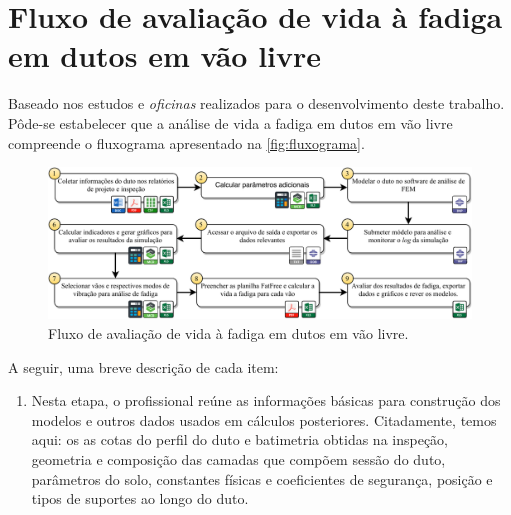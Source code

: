 \section{Fluxo de avaliação de vida à fadiga em dutos em vão livre}\label{chap:workflow}


Baseado nos estudos e \textit{oficinas} realizados para o desenvolvimento deste trabalho. Pôde-se estabelecer que a análise de vida a fadiga em dutos em vão livre compreende o fluxograma apresentado na \autoref{fig:fluxograma}.

\begin{figure}[!ht]
    \centering
    \caption{Fluxo de avaliação de vida à fadiga em dutos em vão livre.}\label{fig:fluxograma}
    \includegraphics[width=\textwidth]{imagens/fluxograma.pdf}
\end{figure}

A seguir, uma breve descrição de cada item:

\begin{enumerate}[label=(\arabic*)]
    \item Nesta etapa, o profissional reúne as informações básicas para construção dos modelos e outros dados usados em cálculos posteriores. Citadamente, temos aqui: os as cotas do perfil do duto e batimetria obtidas na inspeção, geometria e composição das camadas que compõem sessão do duto, parâmetros do solo, constantes físicas e coeficientes de segurança, posição e tipos de suportes ao longo do duto.
\end{enumerate}{}